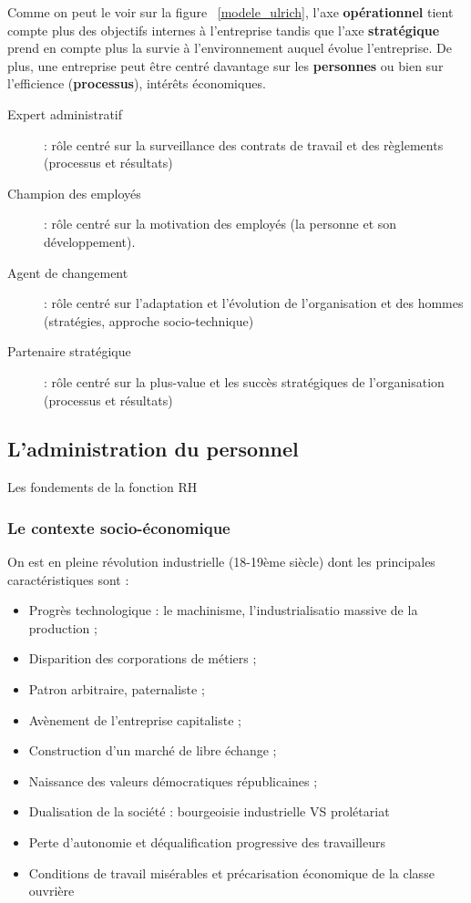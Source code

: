 \documentclass[12pt]{article}
\begin{document}
	  Comme on peut le voir sur la figure ~\ref{modele_ulrich}, l'axe \textbf{opérationnel} tient compte plus des objectifs internes à l'entreprise tandis que l'axe \textbf{stratégique} prend en compte plus la survie à l'environnement auquel évolue l'entreprise. De plus, une entreprise peut être centré davantage sur les \textbf{personnes} ou bien sur l'efficience (\textbf{processus}), intérêts économiques.\newline
	  
	  \begin{description}
	   \item[Expert administratif] : rôle centré sur la surveillance des contrats de travail et des règlements (processus et résultats)
	   \item[Champion des employés] : rôle centré sur la motivation des employés (la personne et son développement).
	   \item[Agent de changement] : rôle centré sur l'adaptation et l'évolution de l'organisation et des hommes (stratégies, approche socio-technique)
	   \item[Partenaire stratégique] : rôle centré sur la plus-value et les succès stratégiques de l'organisation (processus et résultats)
	  \end{description}
	  
	\subsection{L'administration du personnel}
	Les fondements de la fonction RH
	  \subsubsection{Le contexte socio-économique}
	  On est en pleine révolution industrielle (18-19ème siècle) dont les principales caractéristiques sont :
	  
	  \begin{itemize}
	   \item Progrès technologique : le machinisme, l'industrialisatio massive de la production ;
	   \item Disparition des corporations de métiers ;
	   \item Patron arbitraire, paternaliste ;
	   \item Avènement de l'entreprise capitaliste ;
	   \item Construction d'un marché de libre échange ;
	   \item Naissance des valeurs démocratiques républicaines ;
	   \item Dualisation de la société : bourgeoisie industrielle VS prolétariat
	   \item Perte d'autonomie et déqualification progressive des travailleurs
	   \item Conditions de travail misérables et précarisation économique de la classe ouvrière
	  \end{itemize}
	  
\end{document}
